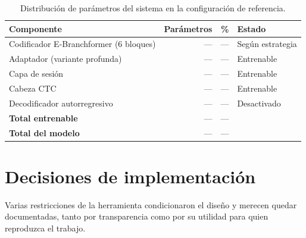 \begin{table}[H]
  \centering
  \caption{Distribución de parámetros del sistema en la configuración de referencia.}
  \label{tab:parametros-sistema}
  \small
  \begin{tabular}{lrrl}
    \toprule
    \textbf{Componente} & \textbf{Parámetros} & \textbf{\%} & \textbf{Estado} \\
    \midrule
    Codificador E-Branchformer (6 bloques) & --- & --- & Según estrategia \\
    Adaptador (variante profunda)          & --- & --- & Entrenable \\
    Capa de sesión                         & --- & --- & Entrenable \\
    Cabeza CTC                             & --- & --- & Entrenable \\
    Decodificador autorregresivo           & --- & --- & Desactivado \\
    \midrule
    \textbf{Total entrenable}              & --- & --- & \\
    \textbf{Total del modelo}              & --- & --- & \\
    \bottomrule
  \end{tabular}
\end{table}


\section{Decisiones de implementación}
\label{sec:decisiones-implementacion}

Varias restricciones de la herramienta condicionaron el diseño y merecen quedar documentadas, tanto por transparencia como por su utilidad para quien reproduzca el trabajo.

